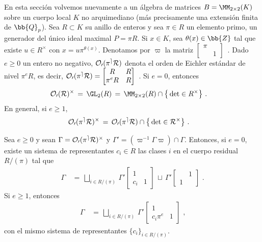 En esta secci\'{o}n volvemos nuevamente a un \'{a}lgebra de matrices
$B=\MM_{2\times 2}(K)$ sobre un cuerpo local $K$ no arquimediano (m\'{a}s
precisamente una extensi\'{o}n finita de $\bb{Q}_{p}$). Sea $R\subset K$ su
anillo de enteros y sea $\pi\in R$ un elemento primo, un generador del
\'{u}nico ideal maximal $P=\pi R$. Si $x\in K$, sea $\theta(x)\in\bb{Z}$ tal
que existe $u\in R^{\times}$ con $x=u\pi^{\theta(x)}$. Denotamos por $\varpi$
la matriz
\begin{math}
	\begin{bmatrix} \pi & \\ & 1 \end{bmatrix}
\end{math}~.
Dado $e\geq 0$ un entero no negativo, $\cal{O}_{0}(\pi^{e}R)$ denota el orden
de Eichler est\'{a}ndar de nivel $\pi^{e}R$, es decir,
\begin{math}
	\cal{O}_{0}(\pi^{e}R)=
		\begin{bmatrix} R & R \\ \pi^{e}R & R \end{bmatrix}
\end{math}~.
Si $e=0$, entonces
\begin{align*}
	\cal{O}_{0}(R)^{\times} & \,=\,\GL_{2}(R) \,=\,
		\MM_{2\times 2}(R)\cap\big\{\det\in R^{\times}\big\}
	\text{ .}
\end{align*}
%
En general, si $e\geq 1$,
\begin{align*}
	\cal{O}_{0}(\pi^{e}R)^{\times} & \,=\,\cal{O}_{0}(\pi^{e}R)\cap
		\big\{\det\in R^{\times}\big\}
	\text{ .}
\end{align*}
%

\begin{propoDescomposicionEnCoclasesADerecha}
	\label{thm:descomposicionencoclasesaderecha}
	Sea $e\geq 0$ y sean $\Gamma=\cal{O}_{0}(\pi^{e}R)^{\times}$ y
	$\Gamma'=(\varpi^{-1}\Gamma\varpi)\cap\Gamma$. Entonces, si $e=0$,
	existe un sistema de representantes $c_{i}\in R$ las clases $i$ en el
	cuerpo residual $R/(\pi)$ tal que
	\begin{align*}
		\Gamma & \,=\, \bigsqcup_{i\in R/(\pi)}\,
			\Gamma'\begin{bmatrix} 1 & \\ c_{i} & 1 \end{bmatrix}
			\,\sqcup\,
			\Gamma'\begin{bmatrix} & 1 \\ 1 & \end{bmatrix}
		\text{ .}
	\end{align*}
	Si $e\geq 1$, entonces
	\begin{align*}
		\Gamma & \,=\, \bigsqcup_{i\in R/(\pi)}\,
			\Gamma'\begin{bmatrix} 1 & \\
				c_{i}\pi^{e} & 1 \end{bmatrix}
		\text{ ,}
	\end{align*}
	con el mismo sistema de representantes $\{c_{i}\}_{i\in R/(\pi)}$.
\end{propoDescomposicionEnCoclasesADerecha}

